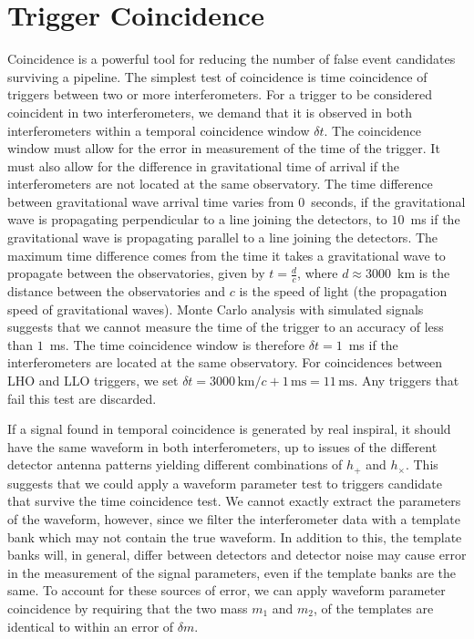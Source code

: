 \section{Trigger Coincidence}
\label{s:coincidence}

Coincidence is a powerful tool for reducing the number of false event
candidates surviving a pipeline. The simplest test of coincidence is time
coincidence of triggers between two or more interferometers.  For a trigger to
be considered coincident in two interferometers, we demand that it is observed
in both interferometers within a temporal coincidence window $\delta t$. The
coincidence window must allow for the error in measurement of the time of the
trigger. It must also allow for the difference in gravitational time of
arrival if the interferometers are not located at the same observatory.  The
time difference between gravitational wave arrival time varies from
$0$~seconds, if the gravitational wave is propagating perpendicular to a line
joining the detectors, to $10$~ms if the gravitational wave is propagating
parallel to a line joining the detectors. The maximum time difference comes
from the time it takes a gravitational wave to propagate between the
observatories, given by $t = \frac{d}{c}$, where $d \approx 3000$~km is the
distance between the observatories and $c$ is the speed of light
(the propagation speed of gravitational waves).  Monte Carlo analysis with
simulated signals suggests that we cannot measure the time of the trigger to
an accuracy of less than $1$~ms. The time coincidence window is therefore
$\delta t = 1$~ms if the interferometers are located at the same observatory.
For coincidences between LHO and LLO triggers, we set $\delta t =
3000\,\mathrm{km} / c + 1\,\mathrm{ms} = 11\, \mathrm{ms}$. Any triggers
that fail this test are discarded. 

If a signal found in temporal coincidence is generated by real inspiral, it
should have the same waveform in both interferometers, up to issues of the
different detector antenna patterns yielding different combinations of $h_{+}$
and $h_{\times}$. This suggests that we could apply a waveform parameter test
to triggers candidate that survive the time coincidence test. We cannot
exactly extract the parameters of the waveform, however, since we filter the
interferometer data with a template bank which may not contain the true
waveform. In addition to this, the template banks will, in general, differ
between detectors and detector noise may cause error in the measurement of the
signal parameters, even if the template banks are the same. To account for
these sources of error, we can apply waveform parameter coincidence by
requiring that the two mass $m_1$ and $m_2$, of the templates are identical to
within an error of $\delta m$.

